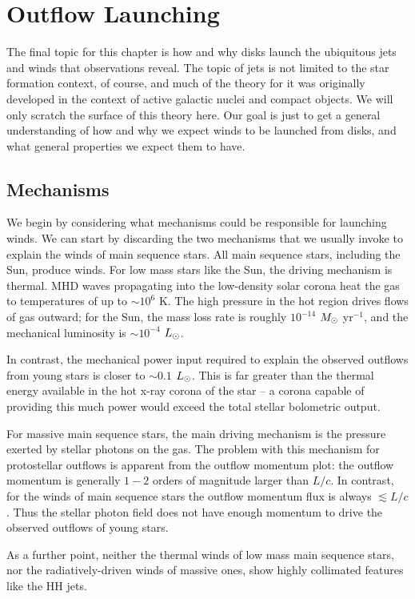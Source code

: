 \section{Outflow Launching}

The final topic for this chapter is how and why disks launch the ubiquitous jets and winds that observations reveal. The topic of jets is not limited to the star formation context, of course, and much of the theory for it was originally developed in the context of active galactic nuclei and compact objects. We will only scratch the surface of this theory here. Our goal is just to get a general understanding of how and why we expect winds to be launched from disks, and what general properties we expect them to have.

\subsection{Mechanisms}

We begin by considering what mechanisms could be responsible for launching winds. We can start by discarding the two mechanisms that we usually invoke to explain the winds of main sequence stars. All main sequence stars, including the Sun, produce winds. For low mass stars like the Sun, the driving mechanism is thermal. MHD waves propagating into the low-density solar corona heat the gas to temperatures of up to $\sim 10^6$ K. The high pressure in the hot region drives flows of gas outward; for the Sun, the mass loss rate is roughly $10^{-14}$ $M_{\odot}$ yr$^{-1}$, and the mechanical luminosity is $\sim 10^{-4}$ $L_{\odot}$.

In contrast, the mechanical power input required to explain the observed outflows from young stars is closer to $\sim 0.1$ $L_{\odot}$. This is far greater than the thermal energy available in the hot x-ray corona of the star -- a corona capable of providing this much power would exceed the total stellar bolometric output.

For massive main sequence stars, the main driving mechanism is the pressure exerted by stellar photons on the gas. The problem with this mechanism for protostellar outflows is apparent from the outflow momentum plot: the outflow momentum is generally $1-2$ orders of magnitude larger than $L/c$. In contrast, for the winds of main sequence stars the outflow momentum flux is always $\lesssim L/c$. Thus the stellar photon field does not have enough momentum to drive the observed outflows of young stars.

As a further point, neither the thermal winds of low mass main sequence stars, nor the radiatively-driven winds of massive ones, show highly collimated features like the HH jets.

